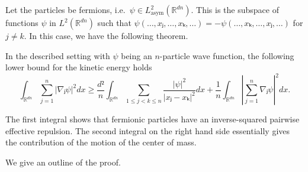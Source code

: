 Let the particles be fermions, i.e.\ $ψ ∈ L_\text{asym}^2(ℝ^{dn})$. This is the subspace of functions $ψ$ in $L^2(ℝ^{dn})$ such that $ψ(…, xⱼ, …, xₖ, …) = - ψ(…, xₖ, …, xⱼ, …)$ for $j \ne k$. In this case, we have the following theorem. \cite{hoholt,methmmp}

\begin{theorem}\label{thm:hardy fermion}
  In the described setting with $ψ$ being an $n$-particle wave function, the following lower bound for the kinetic energy holds
  \begin{equation}\label{eq:fermion ineq}
    ∫_{ℝ^{dn}} ∑_{j=1}^n |∇ⱼψ|^2 dx \ge
    \frac{d²}{n} ∫_{ℝ^{dn}} ∑_{1≤j<k≤n} \frac{|ψ|^2}{|xⱼ-xₖ|^2} dx +
    \frac{1}{n} ∫_{ℝ^{dn}} \left|∑_{j=1}^n ∇ⱼ ψ \right|^2 dx.
  \end{equation}
\end{theorem}

The first integral shows that fermionic particles have an inverse-squared pairwise effective repulsion. The second integral on the right hand side essentially gives the contribution of the motion of the center of mass.

We give an outline of the proof.

